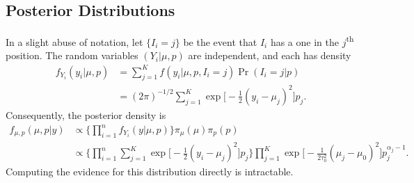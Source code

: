 \documentclass[11pt]{article}
\begin{document}
\subsection{Posterior Distributions} \label{sec:posteriors}
In a slight abuse of notation, let $\{I_i = j\}$ be the event that $I_i$ has
a one in the $j$\textsuperscript{th} position.
The random variables $(Y_i \vert \mu, p)$ are independent,
and each has density
\begin{align*}
    f_{Y_i}(y_i \vert \mu, p)
    &=
    \sum_{j=1}^K f(y_i \vert \mu, p, I_i = j) \Pr(I_i = j \vert p)
    \\ &=
    (2\pi)^{-1/2} \sum_{j=1}^K 
        \exp \biggl[
            -\frac{1}{2} (y_i - \mu_j)^2
        \biggr]
        p_j.
\end{align*}
Consequently, the posterior density is
\begin{align*}
    f_{\mu, p}(\mu, p \vert y)
    &\propto
    \Biggl\{ \prod_{i=1}^n f_{Y_i}(y \vert \mu, p) \Biggr\}
    \pi_\mu(\mu) \pi_p(p)
    \\ &\propto
    \Biggl\{
        \prod_{i=1}^n \sum_{j=1}^K 
        \exp \biggl[
            -\frac{1}{2} (y_i - \mu_j)^2
        \biggr]
        p_j
    \Biggr\}
    \prod_{j = 1}^K
    \exp\biggl[
        -\frac{1}{2\tau_0^2} (\mu_j - \mu_0)^2
    \biggr]
    p_j^{\alpha_j - 1}.
\end{align*}
Computing the evidence for this distribution directly is intractable.
\end{document}
